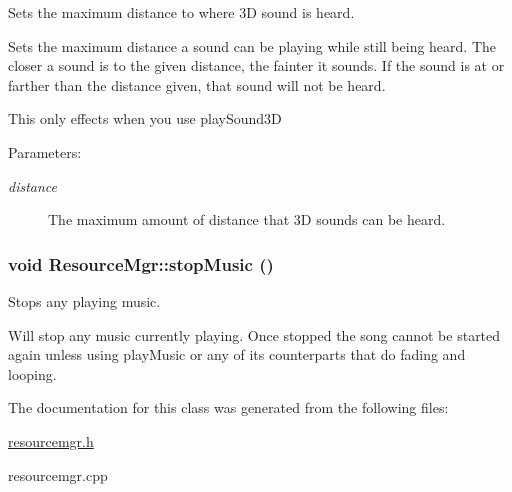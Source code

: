 Sets the maximum distance to where 3D sound is heard. 

Sets the maximum distance a sound can be playing while still being heard. The closer a sound is to the given distance, the fainter it sounds. If the sound is at or farther than the distance given, that sound will not be heard.

This only effects when you use playSound3D \begin{Desc}
\item[Parameters:]
\begin{description}
\item[{\em distance}]The maximum amount of distance that 3D sounds can be heard. \end{description}
\end{Desc}
\hypertarget{class_resource_mgr_c6c4165497719f7c5c523decb5dfe5fa}{
\subsubsection[{stopMusic}]{\setlength{\rightskip}{0pt plus 5cm}void ResourceMgr::stopMusic ()}}
\label{class_resource_mgr_c6c4165497719f7c5c523decb5dfe5fa}


Stops any playing music. 

Will stop any music currently playing. Once stopped the song cannot be started again unless using playMusic or any of its counterparts that do fading and looping. 

The documentation for this class was generated from the following files:\begin{CompactItemize}
\item 
\hyperlink{resourcemgr_8h}{resourcemgr.h}\item 
resourcemgr.cpp\end{CompactItemize}
